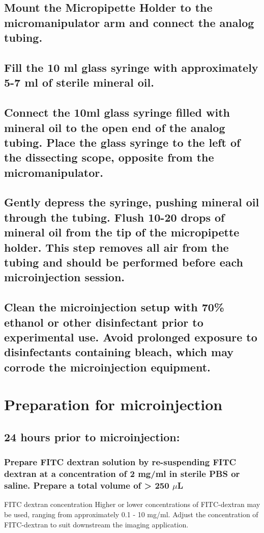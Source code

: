 \documentclass[11pt]{article}
\begin{document}
\subsection{{\bfseries\sffamily } Mount the Micropipette Holder to the micromanipulator arm and connect the analog tubing.}
\label{sec:orgheadline5}
\subsection{{\bfseries\sffamily } Fill the 10 ml glass syringe with approximately 5-7 ml of sterile mineral oil.}
\label{sec:orgheadline6}
\subsection{{\bfseries\sffamily } Connect the 10ml glass syringe filled with mineral oil to the open end of the analog tubing. Place the glass syringe to the left of the dissecting scope, opposite from the micromanipulator.}
\label{sec:orgheadline7}
\subsection{{\bfseries\sffamily } Gently depress the syringe, pushing mineral oil through the tubing. Flush 10-20 drops of mineral oil from the tip of the micropipette holder. This step removes all air from the tubing and should be performed before each microinjection session.}
\label{sec:orgheadline8}
\subsection{{\bfseries\sffamily } Clean the microinjection setup with 70\% ethanol or other disinfectant prior to experimental use. Avoid prolonged exposure to disinfectants containing bleach, which may corrode the microinjection equipment.}
\label{sec:orgheadline9}
\section{{\bfseries\sffamily } Preparation for microinjection}
\label{sec:orgheadline42}

\subsection{{\bfseries\sffamily } 24 hours prior to microinjection:}
\label{sec:orgheadline13}
\subsubsection{{\bfseries\sffamily } Prepare FITC dextran solution by re-suspending FITC dextran at a concentration of 2 mg/ml in sterile PBS or saline. Prepare a total volume of > 250 \(\mu\)L}
\label{sec:orgheadline11}
\begin{bclogo}[logo=\bcinfo, couleurBarre=Black, noborder=true, couleur=gray!10]{     FITC dextran concentration}
Higher or lower concentrations of FITC-dextran may be used, ranging from approximately 0.1 - 10 mg/ml. Adjust the concentration of FITC-dextran to suit downstream the imaging application.\\
\end{bclogo}
\end{document}
